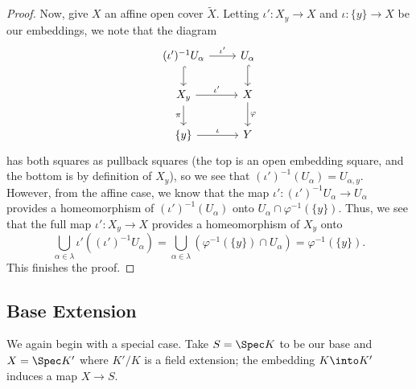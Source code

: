 \documentclass[../notes.tex]{subfiles}
\begin{document}
\begin{proof}
	Now, give $X$ an affine open cover $\widetilde X$. Letting $\iota'\colon X_y\to X$ and $\iota\colon\{y\}\to X$ be our embeddings, we note that the diagram
	\[\begin{tikzcd}
		{(\iota')^{-1}U_\alpha} & {U_\alpha} \\
		{X_y} & X \\
		{\{y\}} & Y
		\arrow["\varphi", from=2-2, to=3-2]
		\arrow[hook, from=1-2, to=2-2]
		\arrow["\pi"', from=2-1, to=3-1]
		\arrow["\iota", from=3-1, to=3-2]
		\arrow["{\iota'}", from=2-1, to=2-2]
		\arrow["{\iota'}", from=1-1, to=1-2]
		\arrow[hook, from=1-1, to=2-1]
	\end{tikzcd}\]
	has both squares as pullback squares (the top is an open embedding square, and the bottom is by definition of $X_y$), so we see that $(\iota')^{-1}(U_\alpha)=U_{\alpha,y}$. However, from the affine case, we know that the map $\iota'\colon(\iota')^{-1}U_\alpha\to U_\alpha$ provides a homeomorphism of $(\iota')^{-1}(U_\alpha)$ onto $U_\alpha\cap\varphi^{-1}(\{y\})$. Thus, we see that the full map $\iota'\colon X_y\to X$ provides a homeomorphism of $X_y$ onto
	\[\bigcup_{\alpha\in\lambda}\iota'\left((\iota')^{-1}U_\alpha\right)=\bigcup_{\alpha\in\lambda}(\varphi^{-1}(\{y\})\cap U_\alpha)=\varphi^{-1}(\{y\}).\]
	This finishes the proof.
\end{proof}

\subsection{Base Extension}
We again begin with a special case. Take $S=\Spec K$ to be our base and $X=\Spec K'$ where $K'/K$ is a field extension; the embedding $K\into K'$ induces a map $X\to S$.
\end{document}
